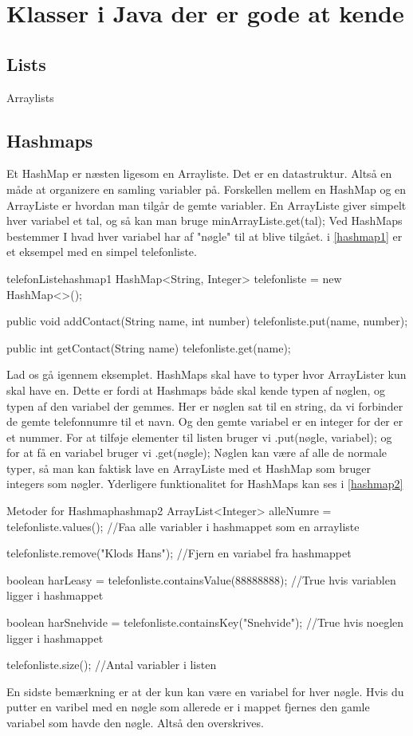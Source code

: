 \section{Klasser i Java der er gode at kende}

\subsection{Lists}

Arraylists

\subsection{Hashmaps}
Et HashMap er næsten ligesom en Arrayliste. Det er en datastruktur. Altså en måde at organizere en samling variabler på. Forskellen mellem en HashMap og en ArrayListe er hvordan man tilgår de gemte variabler. En ArrayListe giver simpelt hver variabel et tal, og så kan man bruge minArrayListe.get(tal); Ved HashMaps bestemmer I hvad hver variabel har af "nøgle" til at blive tilgået. i \autoref{hashmap1} er et eksempel med en simpel telefonliste.
\begin{JavaCode}{telefonListe}{hashmap1}
	HashMap<String, Integer> telefonliste = new HashMap<>();
	
	public void addContact(String name, int number){
		telefonliste.put(name, number);
	}
	
	public int getContact(String name){
		telefonliste.get(name);	
	}
\end{JavaCode}
Lad os gå igennem eksemplet. HashMaps skal have to typer hvor ArrayLister kun skal have en. Dette er fordi at Hashmaps både skal kende typen af nøglen, og typen af den variabel der gemmes. Her er nøglen sat til en string, da vi forbinder de gemte telefonnumre til et navn. Og den gemte variabel er en integer for der er et nummer.  For at tilføje elementer til listen bruger vi .put(nøgle, variabel); og for at få en variabel bruger vi .get(nøgle); Nøglen kan være af alle de normale typer, så man kan faktisk lave en ArrayListe med et HashMap som bruger integers som nøgler. Yderligere funktionalitet for HashMaps kan ses i \autoref{hashmap2}
\begin{JavaCode}{Metoder for Hashmap}{hashmap2}
	ArrayList<Integer> alleNumre = telefonliste.values();
	//Faa alle variabler i hashmappet som en arrayliste
	
	telefonliste.remove("Klods Hans");
	//Fjern en variabel fra hashmappet
	
	boolean harLeasy = telefonliste.containsValue(88888888);
	//True hvis variablen ligger i hashmappet
	
	boolean harSnehvide = telefonliste.containsKey("Snehvide");
	//True hvis noeglen ligger i hashmappet
	
	telefonliste.size();
	//Antal variabler i listen
\end{JavaCode}
En sidste bemærkning er at der kun kan være en variabel for hver nøgle. Hvis du putter en varibel med en nøgle som allerede er i mappet fjernes den gamle variabel som havde den nøgle. Altså den overskrives.

